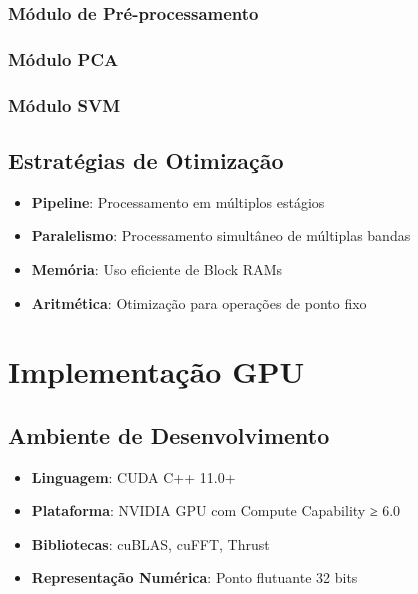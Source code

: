 \subsubsection{Módulo de Pré-processamento}

\subsubsection{Módulo PCA}

\subsubsection{Módulo SVM}

\subsection{Estratégias de Otimização}
\begin{itemize}
    \item \textbf{Pipeline}: Processamento em múltiplos estágios
    \item \textbf{Paralelismo}: Processamento simultâneo de múltiplas bandas
    \item \textbf{Memória}: Uso eficiente de Block RAMs
    \item \textbf{Aritmética}: Otimização para operações de ponto fixo
\end{itemize}

\section{Implementação GPU}\label{sec:impl_gpu}

\subsection{Ambiente de Desenvolvimento}
\begin{itemize}
    \item \textbf{Linguagem}: CUDA C++ 11.0+
    \item \textbf{Plataforma}: NVIDIA GPU com Compute Capability ≥ 6.0
    \item \textbf{Bibliotecas}: cuBLAS, cuFFT, Thrust
    \item \textbf{Representação Numérica}: Ponto flutuante 32 bits
\end{itemize}

